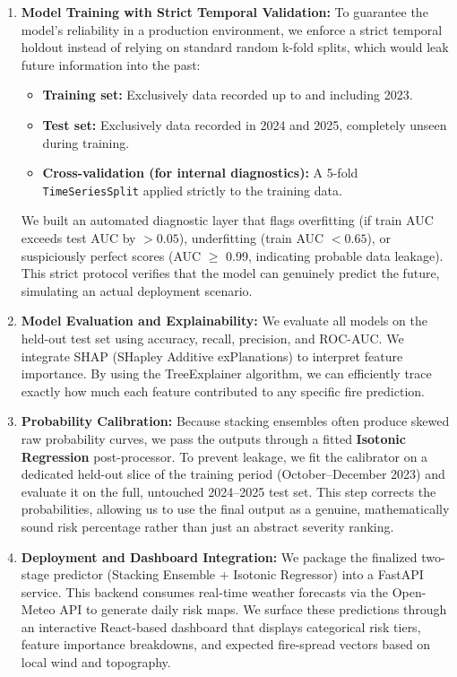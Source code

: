 \documentclass[11pt]{article}
\begin{document}
\begin{enumerate}
    \item \textbf{Model Training with Strict Temporal Validation:} To guarantee the model's reliability in a production environment, we enforce a strict temporal holdout instead of relying on standard random k-fold splits, which would leak future information into the past:
    \begin{itemize}
        \item \textbf{Training set:} Exclusively data recorded up to and including 2023.
        \item \textbf{Test set:} Exclusively data recorded in 2024 and 2025, completely unseen during training.
        \item \textbf{Cross-validation (for internal diagnostics):} A 5-fold \texttt{TimeSeriesSplit} applied strictly to the training data.
    \end{itemize}
    We built an automated diagnostic layer that flags overfitting (if train AUC exceeds test AUC by $> 0.05$), underfitting (train AUC $< 0.65$), or suspiciously perfect scores (AUC $\geq$ 0.99, indicating probable data leakage). This strict protocol verifies that the model can genuinely predict the future, simulating an actual deployment scenario.
    
    \item \textbf{Model Evaluation and Explainability:} We evaluate all models on the held-out test set using accuracy, recall, precision, and ROC-AUC. We integrate SHAP (SHapley Additive exPlanations) to interpret feature importance. By using the TreeExplainer algorithm, we can efficiently trace exactly how much each feature contributed to any specific fire prediction.
    
    \item \textbf{Probability Calibration:} Because stacking ensembles often produce skewed raw probability curves, we pass the outputs through a fitted \textbf{Isotonic Regression} post-processor. To prevent leakage, we fit the calibrator on a dedicated held-out slice of the training period (October--December 2023) and evaluate it on the full, untouched 2024--2025 test set. This step corrects the probabilities, allowing us to use the final output as a genuine, mathematically sound risk percentage rather than just an abstract severity ranking.
    
    \item \textbf{Deployment and Dashboard Integration:} We package the finalized two-stage predictor (Stacking Ensemble + Isotonic Regressor) into a FastAPI service. This backend consumes real-time weather forecasts via the Open-Meteo API to generate daily risk maps. We surface these predictions through an interactive React-based dashboard that displays categorical risk tiers, feature importance breakdowns, and expected fire-spread vectors based on local wind and topography.
\end{enumerate}
\end{document}
